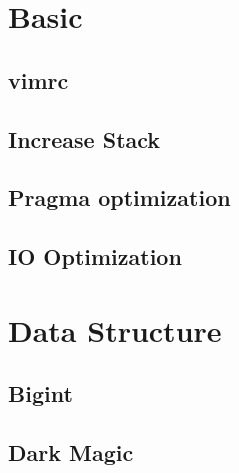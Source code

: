 \documentclass[a4paper,10pt,twocolumn,oneside]{article}
\begin{document}
\pagestyle{fancy}
\fancyfoot{}
\fancyhead[R]{\thepage}
\renewcommand{\headrulewidth}{0.4pt}
\renewcommand{\contentsname}{Contents} 

\scriptsize
\tableofcontents


\section{Basic}
\subsection{vimrc}

\subsection{Increase Stack}

\subsection{Pragma optimization}

% 
% 
\subsection{IO Optimization}


\section{Data Structure}
\subsection{Bigint}

\subsection{Dark Magic}

% 
\end{document}
